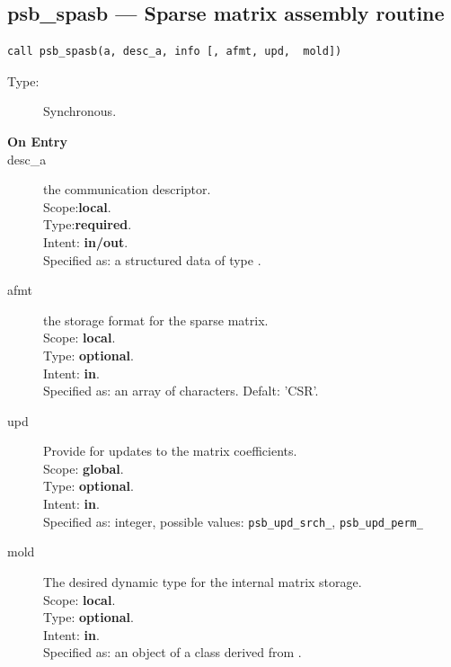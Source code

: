 %
%
\clearpage\subsection{psb\_spasb --- Sparse matrix assembly routine}

\begin{verbatim}
call psb_spasb(a, desc_a, info [, afmt, upd,  mold])
\end{verbatim}

\begin{description}
\item[Type:] Synchronous.
\item[\bf On Entry]
\item[desc\_a] the communication descriptor.\\
Scope:{\bf local}.\\
Type:{\bf required}.\\
Intent: {\bf in/out}.\\
Specified as: a structured data of type \descdata.
\item[afmt] the storage format for the sparse matrix.\\
Scope: {\bf local}.\\
Type: {\bf optional}.\\
Intent: {\bf in}.\\
Specified as: an array of characters. Defalt:  'CSR'.
\item[upd] Provide for updates to the matrix coefficients.\\
Scope: {\bf global}.\\
Type: {\bf optional}.\\
Intent: {\bf in}.\\
Specified as: integer, possible values: \verb|psb_upd_srch_|, \verb|psb_upd_perm_|
\item[mold] The desired dynamic type for the internal matrix storage.\\
Scope: {\bf local}.\\
Type: {\bf optional}.\\
Intent: {\bf in}.\\
Specified as: an object of a class derived from \spbasedata. 
\end{description}

